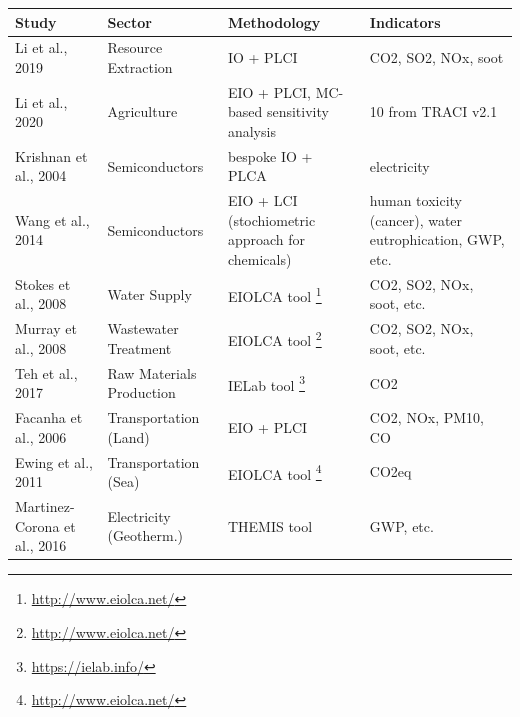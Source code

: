 \documentclass{article}
\begin{document}
        \begin{table}[H]
            \centering
            \begin{tabularx}{\textwidth}{| X | X | X | X |}
                \hline
                    \textbf{Study} & \textbf{Sector} & \textbf{Methodology} & \textbf{Indicators} \\
                \hline
                    Li et al., 2019 \cite{li_economic_2019} & Resource Extraction & IO + PLCI & CO2, SO2, NOx, soot \\
                \hline
                    Li et al., 2020 \cite{li_life_2020} & Agriculture & EIO + PLCI, MC-based sensitivity analysis & 10 from TRACI v2.1 \\ %
                \hline
                    Krishnan et al., 2004 \cite{krishnan_using_2004} & Semiconductors & bespoke IO + PLCA & electricity \\
                \hline
                    Wang et al., 2014 \cite{wang_hybrid_2014} & Semiconductors & EIO + LCI (stochiometric approach for chemicals) & human toxicity (cancer), water eutrophication, GWP, etc. \\
                \hline
                    Stokes et al., 2008 \cite{stokes_energy_2009} & Water Supply & EIOLCA tool \footnote{\url{http://www.eiolca.net/}} & CO2, SO2, NOx, soot, etc. \\
                \hline
                    Murray et al., 2008 \cite{murray_hybrid_2008} & Wastewater Treatment & EIOLCA tool \footnote{\url{http://www.eiolca.net/}} & CO2, SO2, NOx, soot, etc. \\
                \hline
                    Teh et al., 2017 \cite{teh_hybrid_2017} & Raw Materials Production & IELab tool \footnote{\url{https://ielab.info/}} & CO2 \\
                \hline
                    Facanha et al., 2006 \cite{horvath_environmental_2006} & Transportation (Land) & EIO + PLCI & CO2, NOx, PM10, CO \\
                \hline
                    Ewing et al., 2011 \cite{ewing_insights_2011} & Transportation (Sea) & EIOLCA tool \footnote{\url{http://www.eiolca.net/}} & CO2eq \\
                \hline
                    Martinez-Corona et al., 2016 \cite{martinez-corona_hybrid_2017} & Electricity (Geotherm.) & THEMIS tool \cite{gibon_methodology_2015} & GWP, etc. \\

\end{tabularx}
\end{table}
\end{document}
